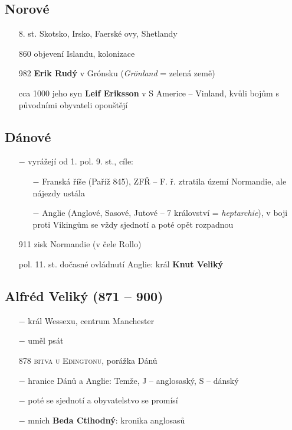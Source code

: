 \documentclass{article}
\begin{document}
\subsection*{Norové}
\begin{itemize}
    \vspace{-0.5em}
    \setlength\itemsep{0.15em}
    \item[8. st.] Skotsko, Irsko, Faerské ovy, Shetlandy
    \item[860] objevení Islandu, kolonizace
    \item[982] \textbf{Erik Rudý} v Grónsku (\textit{Grönland} = zelená země)
    \item[cca 1000] jeho syn \textbf{Leif Eriksson} v S Americe -- Vinland, kvůli bojům s původními obyvateli opouštějí
\end{itemize}

\subsection*{Dánové}
\begin{itemize}
    \vspace{-0.5em}
    \setlength\itemsep{0.15em}
    \item[$-$] vyrážejí od 1. pol. 9. st., cíle:
    \begin{itemize}
        \vspace{-0.5em}
        \setlength\itemsep{0.15em}
        \item[$-$] Franská říše (Paříž 845), ZFŘ -- F. ř. ztratila území Normandie, ale nájezdy ustála
        \item[$-$] Anglie (Anglové, Sasové, Jutové -- 7 království = \textit{heptarchie}), v boji proti Vikingům se vždy sjednotí a poté opět rozpadnou
    \end{itemize}
    \item[911] zisk Normandie (v čele Rollo)
    \item[pol. 11. st.] dočasné ovládnutí Anglie: král \textbf{Knut Veliký}
\end{itemize}

\subsection*{Alfréd Veliký (871 -- 900)}
\begin{itemize}
    \vspace{-0.5em}
    \setlength\itemsep{0.15em}
    \item[$-$] král Wessexu, centrum Manchester
    \item[$-$] uměl psát
    \item[878] \textsc{bitva u Edingtonu}, porážka Dánů
    \item[$-$] hranice Dánů a Anglie: Temže, J -- anglosaský, S -- dánský
    \item[$-$] poté se sjednotí a obyvatelstvo se promísí
    \item[$-$] mnich \textbf{Beda Ctihodný}: kronika anglosasů
\end{itemize}
\end{document}
